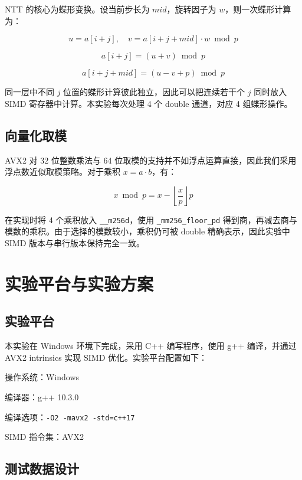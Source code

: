 \documentclass[a4paper,12pt]{ctexart}
\begin{document}
NTT 的核心为蝶形变换。设当前步长为 $mid$，旋转因子为 $w$，则一次蝶形计算为：

\begin{equation}
u=a[i+j],\quad v=a[i+j+mid]\cdot w \bmod p
\end{equation}

\begin{equation}
a[i+j]=(u+v)\bmod p
\end{equation}

\begin{equation}
a[i+j+mid]=(u-v+p)\bmod p
\end{equation}

同一层中不同 $j$ 位置的蝶形计算彼此独立，因此可以把连续若干个 $j$ 同时放入 SIMD 寄存器中计算。本实验每次处理 4 个 double 通道，对应 4 组蝶形操作。

\subsection{向量化取模}

AVX2 对 32 位整数乘法与 64 位取模的支持并不如浮点运算直接，因此我们采用浮点数近似取模策略。对于乘积 $x=a\cdot b$，有：

\begin{equation}
x\bmod p=x-\left\lfloor \frac{x}{p}\right\rfloor p
\end{equation}

在实现时将 4 个乘积放入 \texttt{\_\_m256d}，使用 \texttt{\_mm256\_floor\_pd} 得到商，再减去商与模数的乘积。由于选择的模数较小，乘积仍可被 double 精确表示，因此实验中 SIMD 版本与串行版本保持完全一致。

\section{实验平台与实验方案}

\subsection{实验平台}

本实验在 Windows 环境下完成，采用 C++ 编写程序，使用 g++ 编译，并通过 AVX2 intrinsics 实现 SIMD 优化。实验平台配置如下：

操作系统：Windows

编译器：g++ 10.3.0

编译选项：\texttt{-O2 -mavx2 -std=c++17}

SIMD 指令集：AVX2

\subsection{测试数据设计}
\end{document}
